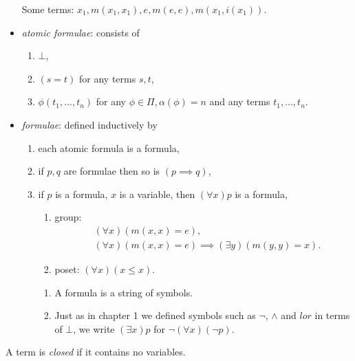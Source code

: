 \documentclass[a4paper]{article}
\begin{document}
\begin{definition}[Language]
\begin{itemize}
\begin{eg}
      Some terms: \(x_1, m(x_1, x_1), e, m(e, e), m(x_1, i(x_1))\).
    \end{eg}
  \item \emph{atomic formulae}: consists of
    \begin{enumerate}
    \item \(\bot\),
    \item \((s = t)\) for any terms \(s, t\),
    \item \(\phi(t_1, \dots, t_n)\) for any \(\phi \in \Pi, \alpha(\phi) = n\) and any terms \(t_1, \dots, t_n\).
    \end{enumerate}
  \item \emph{formulae}: defined inductively by
    \begin{enumerate}
    \item each atomic formula is a formula,
    \item if \(p, q\) are formulae then so is \((p \implies q)\),
    \item if \(p\) is a formula, \(x\) is a variable, then \((\forall x) p\) is a formula,
      \begin{eg}\leavevmode
        \begin{enumerate}
        \item group:
          \begin{align*}
            & (\forall x) (m(x, x) = e), \\
            & (\forall x) (m(x, x) = e) \implies (\exists y)(m(y, y) = x).
          \end{align*}
        \item poset: \((\forall x) (x \leq x)\).
        \end{enumerate}
      \end{eg}
      \begin{note}\leavevmode
        \begin{enumerate}
        \item A formula is a string of symbols.
        \item Just as in chapter 1 we defined symbols such as \(\neg\), \(\land\) and \(lor\) in terms of \(\bot\), we write \((\exists x) p\) for \(\neg (\forall x) (\neg p)\).
        \end{enumerate}
      \end{note}
    \end{enumerate}
  \end{itemize}
\end{definition}

\begin{definition}[Closed]
  A term is \emph{closed} if it contains no variables.
\end{definition}
\end{document}
